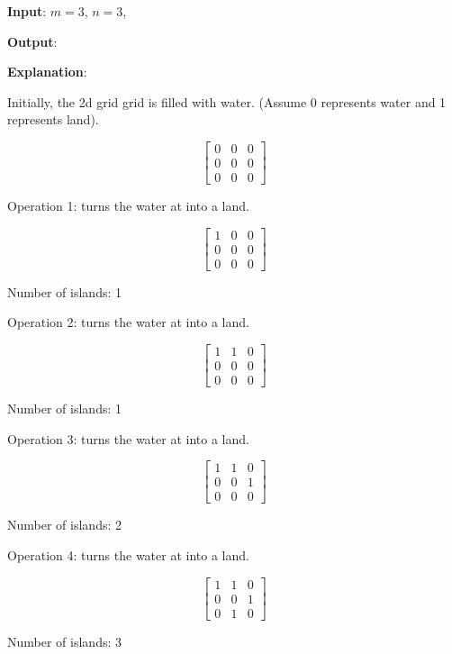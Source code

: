 \begin{flushleft}
\textbf{Input}: $m = 3$, $n = 3$, 

\textbf{Output}: \fcj{[1,1,2,3]}

\textbf{Explanation}:

Initially, the 2d grid grid is filled with water. (Assume 0 represents water and 1 represents land).

\[
\begin{bmatrix}
0 & 0 & 0\\
0 & 0 & 0\\
0 & 0 & 0
\end{bmatrix}
\]


Operation 1:  turns the water at  into a land.

\[
\begin{bmatrix}
1 & 0 & 0\\
0 & 0 & 0\\
0 & 0 & 0
\end{bmatrix}
\]

Number of islands:  1

Operation 2:  turns the water at  into a land.

\[
\begin{bmatrix}
1 & 1 & 0\\
0 & 0 & 0\\
0 & 0 & 0
\end{bmatrix}
\]

Number of islands: 1

Operation 3:  turns the water at  into a land.

\[
\begin{bmatrix}
1 & 1 & 0\\
0 & 0 & 1\\
0 & 0 & 0
\end{bmatrix}
\]

Number of islands: 2

Operation 4:  turns the water at  into a land.

\[
\begin{bmatrix}
1 & 1 & 0\\
0 & 0 & 1\\
0 & 1 & 0
\end{bmatrix}
\]

Number of islands: 3
\end{flushleft}

